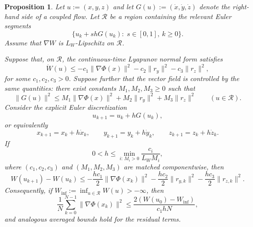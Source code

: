 \documentclass{article}
\newtheorem{proposition}[theorem]{Proposition}
\newcommand{\1}{\mathbf{1}}
\begin{document}
\begin{proposition}\label{prop:euler-one-step}
Let $u:=(x,y,z)$ and let $G(u):=(\dot x,\dot y,\dot z)$ denote the right-hand
side of a coupled flow. Let $\mathcal R$ be a region containing the relevant
Euler segments
\[
\{u_k+s hG(u_k):\; s\in[0,1],\ k\ge 0\}.
\]
Assume that $\nabla W$ is $L_W$-Lipschitz on $\mathcal R$.

Suppose that, on $\mathcal R$, the continuous-time Lyapunov normal form satisfies
\begin{equation}\label{eq:euler-ct-normal-form}
\dot W(u)
\le
-c_1\|\nabla\Phi(x)\|^2
-c_2\|r_y\|^2
-c_3\|r_z\|^2,
\end{equation}
for some $c_1,c_2,c_3>0$. Suppose further that the vector field is controlled by
the same quantities: there exist constants $M_1,M_2,M_3\ge 0$ such that
\begin{equation}\label{eq:euler-vector-field-control}
\|G(u)\|^2
\le
M_1\|\nabla\Phi(x)\|^2
+
M_2\|r_y\|^2
+
M_3\|r_z\|^2
\qquad (u\in\mathcal R).
\end{equation}
Consider the explicit Euler discretization
\[
u_{k+1}=u_k+hG(u_k),
\]
or equivalently
\[
x_{k+1}=x_k+h\dot x_k,\qquad
y_{k+1}=y_k+h\dot y_k,\qquad
z_{k+1}=z_k+h\dot z_k.
\]
If
\begin{equation}\label{eq:euler-h-condition}
0<h\le
\min_{i:\,M_i>0}
\frac{c_i}{L_WM_i},
\end{equation}
where $(c_1,c_2,c_3)$ and $(M_1,M_2,M_3)$ are matched componentwise, then
\begin{equation}\label{eq:euler-one-step-decrease}
W(u_{k+1})-W(u_k)
\le
-\frac{h c_1}{2}\|\nabla\Phi(x_k)\|^2
-\frac{h c_2}{2}\|r_{y,k}\|^2
-\frac{h c_3}{2}\|r_{z,k}\|^2.
\end{equation}
Consequently, if $W_{\inf}:=\inf_{u\in\mathcal R}W(u)>-\infty$, then
\begin{equation}\label{eq:euler-ergodic-bound}
\frac1N\sum_{k=0}^{N-1}\|\nabla\Phi(x_k)\|^2
\le
\frac{2(W(u_0)-W_{\inf})}{c_1hN},
\end{equation}
and analogous averaged bounds hold for the residual terms.
\end{proposition}
\end{document}
